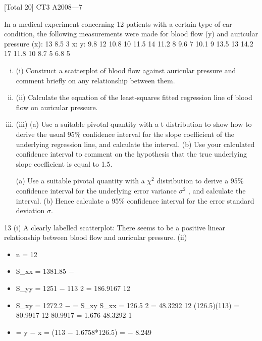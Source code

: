\documentclass[a4paper,12pt]{article}
\begin{document}

[Total 20]
CT3 A2008—7
\item In a medical experiment concerning 12 patients with a certain type of ear condition,
the following measurements were made for blood flow (y) and auricular pressure (x):
13
8.5
3
x:
y:
9.8
12
10.8
10
11.5
14
11.2
8
9.6
7
10.1
9
13.5
13
14.2
17
11.8
10
8.7
5
6.8
5

\begin{enumerate}[(i)]
\item (i) Construct a scatterplot of blood flow against auricular pressure and comment briefly on any relationship between them.

\item (ii) Calculate the equation of the least-squares fitted regression line of blood flow on auricular pressure.

\item (iii) (a) Use a suitable pivotal quantity with a t distribution to show how to derive the usual 95\% confidence interval for the slope coefficient of the underlying regression line, and calculate the interval.
(b) Use your calculated confidence interval to comment on the hypothesis
that the true underlying slope coefficient is equal to 1.5.

(a) Use a suitable pivotal quantity with a $\chi^2$ distribution to derive a 95\% confidence interval for the underlying error variance $\sigma^2$ , and calculate the interval.
(b) Hence calculate a 95\% confidence interval for the error standard deviation $\sigma$.
\end{enumerate}

\newpage
13
(i)
A clearly labelled scatterplot:
There seems to be a positive linear relationship between blood flow and auricular pressure.
(ii)
\begin{itemize}
\item n = 12
\item S_{xx} = 1381.85 −
\item S_{yy} = 1251 −
113 2
= 186.9167
12
\item S_{xy} = 1272.2 −
\hat{\beta}=
S_{xy}
S_{xx}
=
126.5 2
= 48.3292
12
(126.5)(113)
= 80.9917
12
80.9917
= 1.676
48.3292
1
\item \hat{\alpha}= y − \hat{\beta}x = (113 − 1.6758*126.5) = − 8.249
\end{itemize}
\end{document}
